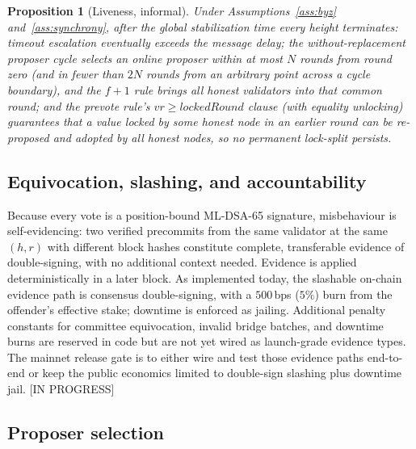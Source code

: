 \documentclass[11pt]{article}
\newcommand{\mldsa}{ML\mbox{-}DSA\mbox{-}65}
\newcommand{\statusP}{\textcolor{statblue}{\textsf{\scriptsize[IN PROGRESS]}}}
\theoremstyle{plain}
\newtheorem{proposition}[theorem]{Proposition}
\theoremstyle{definition}
\theoremstyle{remark}
\begin{document}
\begin{proposition}[Liveness, informal]
Under Assumptions~\ref{ass:byz} and~\ref{ass:synchrony}, after the global
stabilization time every height terminates: timeout escalation eventually
exceeds the message delay; the without-replacement proposer cycle selects an
online proposer within at most $N$ rounds from round zero (and in fewer than
$2N$ rounds from an arbitrary point across a cycle boundary), and the $f{+}1$ rule brings all
honest validators into that common round;
and the prevote rule's $vr \ge \mathit{lockedRound}$ clause (with equality
unlocking) guarantees that a value locked by some honest node in an earlier
round can be re-proposed and adopted by all honest nodes, so no permanent
lock-split persists.
\end{proposition}

\subsection{Equivocation, slashing, and accountability}
\label{sec:slashing}

Because every vote is a position-bound \mldsa{} signature, misbehaviour is
self-evidencing: two verified precommits from the same validator at the same
$(h, r)$ with different block hashes constitute complete, transferable
evidence of double-signing, with no additional context needed. Evidence is
applied deterministically in a later block. As implemented today, the
slashable on-chain evidence path is consensus double-signing, with a
$500$\,bps ($5\%$) burn from the offender's effective stake; downtime is
enforced as jailing. Additional penalty constants for committee equivocation,
invalid bridge batches, and downtime burns are reserved in code but are not
yet wired as launch-grade evidence types. The mainnet release gate is to
either wire and test those evidence paths end-to-end or keep the public
economics limited to double-sign slashing plus downtime jail. \statusP{}

\subsection{Proposer selection}
\label{sec:proposer}
\end{document}
